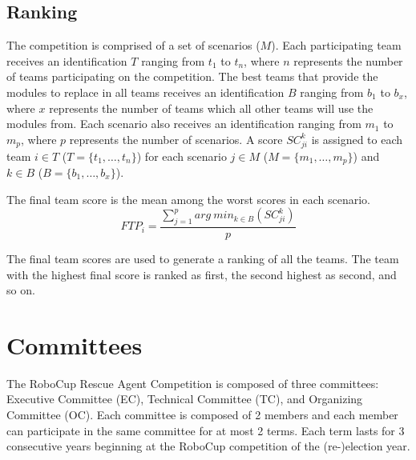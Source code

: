 \documentclass{article}
\begin{document}
\subsection{Ranking}
The competition is comprised of a set of scenarios ($M$). Each participating team receives an identification $T$ ranging from $t_{1}$ to $t_{n}$, where $n$ represents the number of teams participating on the competition. The best teams that provide the modules to replace in all teams receives an identification $B$ ranging from $b_{1}$ to $b_{x}$, where $x$ represents the number of teams which all other teams will use the modules from. Each scenario also receives an identification ranging from $m_{1}$ to $m_{p}$, where $p$ represents the number of scenarios. A score $SC_{ji}^{k}$ is assigned to each team $i \in T$ ($T = \{t_{1},\dots,t_{n}\}$) for each scenario $j \in M$ ($M = \{m_{1},\dots,m_{p}\}$) and $k \in B$ ($B = \{b_{1},\dots,b_{x}\}$).


The final team score is the mean among the worst scores in each scenario.
\begin{equation}
FTP_{i} = \frac{\sum_{j=1}^{p}{arg\ min_{k \in B}(SC_{ji}^{k})}}{p}
\end{equation}

The final team scores are used to generate a ranking of all the teams. The team with the highest final score is ranked as first, the second highest as second, and so on.
\section{Committees}
\label{sec:committees}
The RoboCup Rescue Agent Competition is composed of three committees: Executive Committee (EC), Technical Committee (TC), and Organizing Committee (OC). Each committee is composed of 2 members and each member can participate in the same committee for at most 2 terms. Each term lasts for 3 consecutive years beginning at the RoboCup competition of the (re-)election year.
\end{document}
